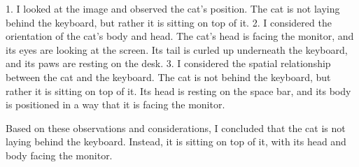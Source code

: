 \begin{enumerate}
        1. I looked at the image and observed the cat’s position. The cat is not laying behind the keyboard, but rather it is sitting on top of it.
        2. I considered the orientation of the cat’s body and head. The cat’s head is facing the monitor, and its eyes are looking at the screen. Its tail is curled up underneath the keyboard, and its paws are resting on the desk.
        3. I considered the spatial relationship between the cat and the keyboard. The cat is not behind the keyboard, but rather it is sitting on top of it. Its head is resting on the space bar, and its body is positioned in a way that it is facing the monitor.
        
        Based on these observations and considerations, I concluded that the cat is not laying behind the keyboard. Instead, it is sitting on top of it, with its head and body facing the monitor.
    \end{enumerate}
